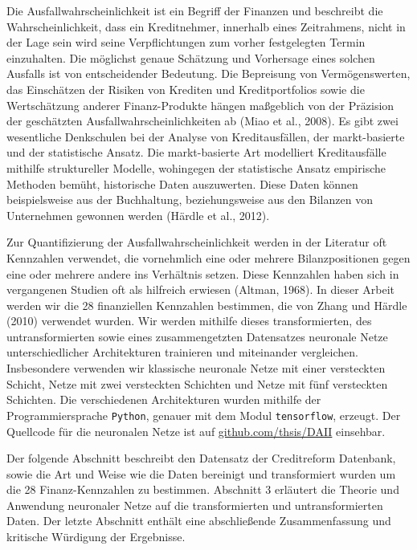 \documentclass{article}
\begin{document}
Die Ausfallwahrscheinlichkeit ist ein Begriff der Finanzen und beschreibt die Wahrscheinlichkeit, dass ein Kreditnehmer, innerhalb eines Zeitrahmens, nicht in der Lage sein wird seine Verpflichtungen zum vorher festgelegten Termin einzuhalten. Die m{\"o}glichst genaue Sch{\"a}tzung und Vorhersage eines solchen Ausfalls ist von entscheidender Bedeutung. Die Bepreisung von Verm{\"o}genswerten, das Einsch{\"a}tzen der Risiken von Krediten und Kreditportfolios sowie die Wertsch{\"a}tzung anderer Finanz-Produkte h{\"a}ngen ma{\ss}geblich von der Pr{\"a}zision der gesch{\"a}tzten Ausfallwahrscheinlichkeiten ab (Miao et al., 2008). Es gibt zwei wesentliche Denkschulen bei der Analyse von Kreditausf{\"a}llen, der markt-basierte und der statistische Ansatz. Die markt-basierte Art modelliert Kreditausf{\"a}lle mithilfe struktureller Modelle, wohingegen der statistische Ansatz empirische Methoden bem{\"u}ht, historische Daten auszuwerten. Diese Daten k{\"o}nnen beispielsweise aus der Buchhaltung, beziehungsweise aus den Bilanzen von Unternehmen gewonnen werden (H{\"a}rdle et al., 2012).

Zur Quantifizierung der Ausfallwahrscheinlichkeit werden in der Literatur oft Kennzahlen verwendet, die vornehmlich eine oder mehrere Bilanzpositionen gegen eine oder mehrere andere ins Verh{\"a}ltnis setzen. Diese Kennzahlen haben sich in vergangenen Studien oft als hilfreich erwiesen (Altman, 1968). In dieser Arbeit werden wir die 28 finanziellen Kennzahlen bestimmen, die von Zhang und H{\"a}rdle (2010) verwendet wurden. Wir werden mithilfe dieses transformierten, des untransformierten sowie eines zusammengetzten Datensatzes neuronale Netze unterschiedlicher Architekturen trainieren und miteinander vergleichen. Insbesondere verwenden wir klassische neuronale Netze mit einer versteckten Schicht, Netze mit zwei versteckten Schichten und Netze mit f{\"u}nf versteckten Schichten. Die verschiedenen Architekturen wurden mithilfe der Programmiersprache \texttt{Python}, genauer mit dem Modul \texttt{tensorflow}, erzeugt. Der Quellcode f{\"u}r die neuronalen Netze ist auf \href{https://github.com/thsis/DAII}{github.com/thsis/DAII} einsehbar.

Der folgende Abschnitt beschreibt den Datensatz der Creditreform Datenbank, sowie die Art und Weise wie die Daten bereinigt und transformiert wurden um die 28 Finanz-Kennzahlen zu bestimmen. Abschnitt 3 erl{\"a}utert die Theorie und Anwendung neuronaler Netze auf die transformierten und untransformierten Daten. Der letzte Abschnitt enth{\"a}lt eine abschlie{\ss}ende Zusammenfassung und kritische W{\"u}rdigung der Ergebnisse.
\end{document}
